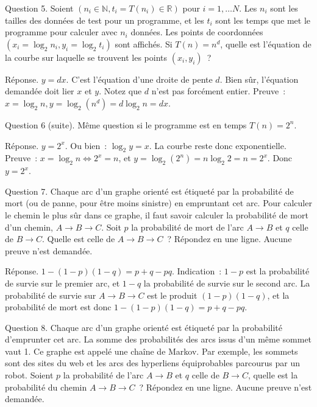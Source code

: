 \documentclass[a4paper,12pt]{article}
\def\N{\mathbb{N}}
\def\R{\mathbb{R}}
\begin{document}


Question 5. Soient $(n_i\in\N, t_i=T(n_i)\in \R)$ pour $i=1, \ldots N$. Les $n_i$ sont les
tailles des données de test pour un programme, et les $t_i$ sont les temps que met le programme pour calculer avec $n_i$ données.  
Les points de coordonnées $(x_i=\log_2 n_i, y_i=\log_2 t_i)$ sont affichés.
Si $T(n)=n^d$, quelle est l'équation de la courbe
sur laquelle se trouvent les points $(x_i, y_i)$~?  

Réponse. $y=dx$.  C'est l'équation d'une droite de pente $d$. Bien sûr, l'équation demandée doit lier $x$ et $y$. Notez que $d$ n'est pas forcément entier.
Preuve~: $x=\log_2 n, y=\log_2(n^d)=d \log_2 n = d x$.

Question 6 (suite). Même question si le programme est en temps $T(n)=2^n$.

Réponse. $y=2^x$. Ou bien~: $\log_2 y=x$. La courbe reste donc exponentielle.
Preuve~: $x=\log_2 n\Leftrightarrow 2^x=n$, et $y=\log_2(2^n)=n \log_2 2= n=2^x$. Donc $y=2^x$.

Question 7. Chaque arc d'un graphe orienté est étiqueté par la probabilité de  mort (ou de panne, pour être moins sinistre)  en empruntant cet arc. 
Pour calculer le chemin le plus sûr dans ce graphe, il faut savoir calculer la probabilité de mort d'un chemin,  $A \rightarrow B \rightarrow C$.
Soit $p$ la probabilité de mort de l'arc  $A \rightarrow B$ et $q$ celle
de $B \rightarrow C$. Quelle est celle de  $A \rightarrow B \rightarrow C$~?
Répondez en une ligne. Aucune preuve n'est demandée.

Réponse. $1-(1-p)(1-q)= p+q - pq $. Indication~: $1-p$ est la probabilité de 
survie sur le premier arc, et $1-q$ la probabilité de 
survie sur le  second arc. La probabilité de survie sur  $A \rightarrow B \rightarrow C$ est le produit $(1-p)(1-q)$, et la probabilité de mort est donc 
$1-(1-p)(1-q)= p+q -pq$.

Question 8.  Chaque arc d'un graphe orienté est étiqueté par la probabilité d'emprunter cet arc. La somme des probabilités des arcs issus d'un même sommet vaut 1. Ce graphe est appelé une chaîne de Markov. Par exemple, les sommets sont des sites du web et les arcs des hyperliens équiprobables parcourus par un robot. Soient $p$ la probabilité de l'arc  $A \rightarrow B$ et $q$ celle
de $B \rightarrow C$, quelle est la probabilité du chemin $A \rightarrow B \rightarrow C$~?
Répondez en une ligne. Aucune preuve n'est demandée.
  
\end{document}
